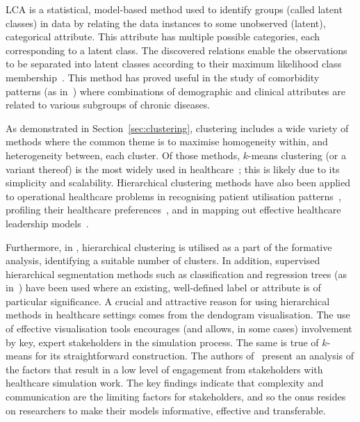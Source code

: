 LCA is a statistical, model-based method used to identify groups (called latent
classes) in data by relating the data instances to some unobserved (latent),
categorical attribute. This attribute has multiple possible categories, each
corresponding to a latent class. The discovered relations enable the
observations to be separated into latent classes according to their maximum
likelihood class membership~\cite{Hagenaars2002,Lazarsfeld1968}. This method has
proved useful in the study of comorbidity patterns (as
in~\cite{Kuwornu2014,Larsen2017}) where combinations of demographic and clinical
attributes are related to various subgroups of chronic diseases.

As demonstrated in Section~\ref{sec:clustering}, clustering includes a wide
variety of methods where the common theme is to maximise homogeneity within, and
heterogeneity between, each cluster. Of those methods, \(k\)-means clustering
(or a variant thereof) is the most widely used in
healthcare~\cite{%
    Elbattah2017,Haraty2015,Ogbuabor2018,Santhi2010,Silitonga2018,Vuik2016a%
}; this is likely due to its simplicity and scalability. Hierarchical clustering
methods have also been applied to operational healthcare problems in recognising
patient utilisation patterns~\cite{Zayas2016}, profiling their healthcare
preferences~\cite{Liu2009}, and in mapping out effective healthcare leadership
models~\cite{Hargett2017}.

Furthermore, in \cite{Vuik2016a}, hierarchical clustering is utilised as a part
of the formative analysis, identifying a suitable number of clusters. In
addition, supervised hierarchical segmentation methods such as classification
and regression trees (as in~\cite{Harper2006,Kumar2019}) have been used where an
existing, well-defined label or attribute is of particular significance. A
crucial and attractive reason for using hierarchical methods in healthcare
settings comes from the dendogram visualisation. The use of effective
visualisation tools encourages (and allows, in some cases) involvement by key,
expert stakeholders in the simulation process. The same is true of \(k\)-means
for its straightforward construction. The authors of~\cite{Jahangirian2015}
present an analysis of the factors that result in a low level of engagement from
stakeholders with healthcare simulation work. The key findings indicate that
complexity and communication are the limiting factors for stakeholders, and so
the onus resides on researchers to make their models informative, effective and
transferable.


